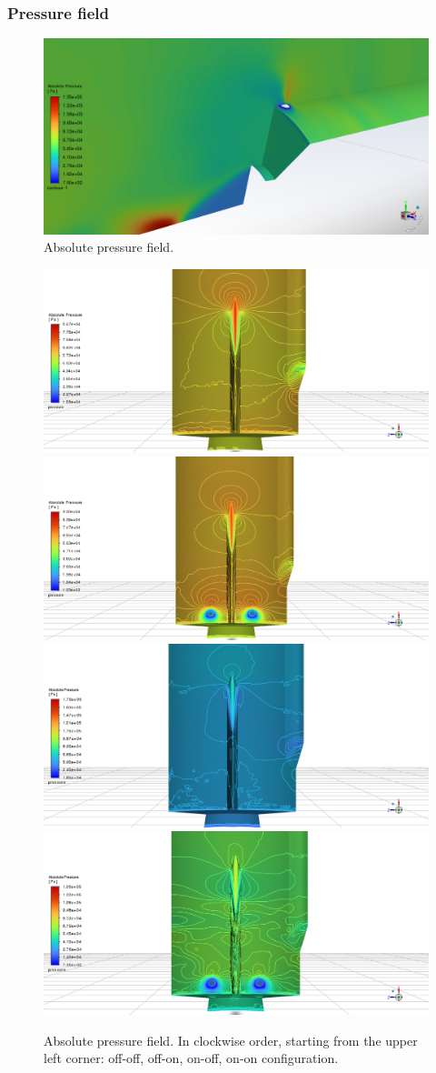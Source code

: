 \documentclass[12pt]{article}
\begin{document}
\subsubsection*{Pressure field}

\begin{figure}[H]
    \centering
    \includegraphics[width=\linewidth]{figs/t39s/pabs2.PNG}
    \caption{Absolute pressure field.}
    \label{fig:enter-label}
\end{figure}

\begin{figure}[H]
    \centering
    \includegraphics[width=0.495\linewidth]{figs/t39s/vernier_zone_pabs_2_offoff.png}
    \includegraphics[width=0.495\linewidth]{figs/t39s/vernier_zone_pabs_2_offon.png}\\
    \includegraphics[width=0.495\linewidth]{figs/t39s/vernier_zone_pabs_2_onoff.png}
    \includegraphics[width=0.495\linewidth]{figs/t39s/vernier_zone_pabs_2_onon.png}
    \caption{Absolute pressure field. In clockwise order, starting from the upper left corner: off-off, off-on, on-off, on-on configuration.}
    \label{fig:pabs-conf-modes_t39s}
\end{figure}
\end{document}
